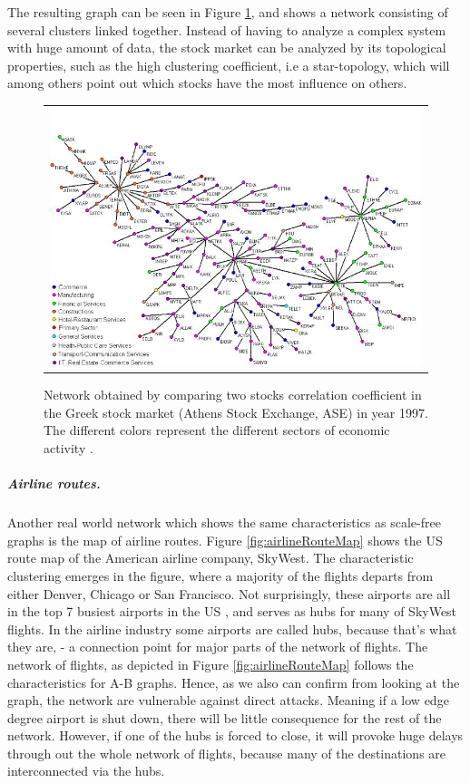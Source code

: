 The resulting graph can be seen in Figure \ref{fig:greekStockMarket}, and shows a network consisting of several clusters linked together. Instead of having to analyze a complex system with huge amount of data, the stock market can be analyzed by its topological properties, such as the high clustering coefficient, i.e a star-topology, which will among others point out which stocks have the most influence on others. 
\begin{figure}[h]
\centering
\begin{tabular}{@{}c@{}}
\includegraphics[width=1.0\textwidth]{../Figures/greekStockMarket.jpg}
\end{tabular}
\caption[Caption for LOF]{Network obtained by comparing two stocks correlation coefficient in the Greek stock market (Athens Stock Exchange, ASE) in year 1997. The different colors represent the different sectors of economic activity \cite{greekStockMarket}.
\label{fig:greekStockMarket}}
\end{figure}

\subparagraph{Airline routes.}
Another real world network which shows the same characteristics as scale-free graphs is the map of airline routes. Figure \ref{fig:airlineRouteMap} shows the US route map of the American airline company, SkyWest. The characteristic clustering emerges in the figure, where a majority of the flights departs from either Denver, Chicago or San Francisco. Not surprisingly, these airports are all in the top 7 busiest airports in the US \cite{busiestAirports}, and serves as hubs for many of SkyWest flights. In the airline industry some airports are called hubs, because that's what they are, - a connection point for major parts of the network of flights. The network of flights, as depicted in Figure \ref{fig:airlineRouteMap} follows the characteristics for A-B graphs. Hence, as we also can confirm from looking at the graph, the network are vulnerable against direct attacks. Meaning if a low edge degree airport is shut down, there will be little consequence for the rest of the network. However, if one of the hubs is forced to close, it will provoke huge delays through out the whole network of flights, because many of the destinations are interconnected via the hubs. 


